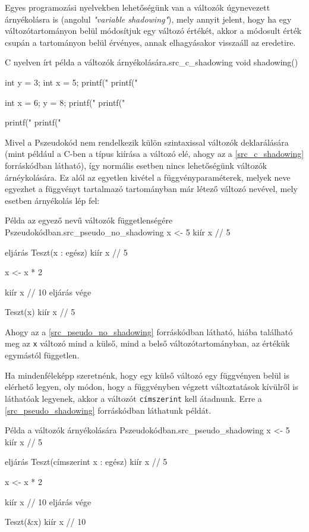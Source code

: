 Egyes programozási nyelvekben lehetőségünk van a változók úgynevezett árnyékolásra is (angolul \textit{"variable shadowing"}), mely annyit jelent, hogy ha egy változótartományon belül módosítjuk egy változó értékét, akkor a módosult érték csupán a tartományon belül érvényes, annak elhagyásakor visszaáll az eredetire.

\begin{code}{C nyelven írt példa a változók árnyékolására.}{src_c_shadowing}
void shadowing() {
    int y = 3;
    int x = 5;
    printf("%
    printf("%

    {
        int x = 6;
        y = 8;
        printf("%
        printf("%
    }

    printf("%
    printf("%
}
\end{code}

Mivel a Pszeudokód nem rendelkezik külön szintaxissal változók deklarálására (mint például a C-ben a típus kiírása a változó elé, ahogy az a \ref{src_c_shadowing} forráskódban látható), így normális esetben nincs lehetőségünk változók árnéykolására. Ez alól az egyetlen kivétel a függvényparaméterek, melyek neve egyezhet a függvényt tartalmazó tartományban már létező változó nevével, mely esetben árnyékolás lép fel:

\begin{code}{Példa az egyező nevű változók függetlenségére Pszeudokódban.}{src_pseudo_no_shadowing}
x <- 5
kiír x // 5

eljárás Teszt(x : egész)
    kiír x // 5

    x <- x * 2

    kiír x // 10
eljárás vége

Teszt(x)
kiír x // 5
\end{code}

Ahogy az a \ref{src_pseudo_no_shadowing} forráskódban látható, hiába található meg az \texttt{x} változó mind a külső, mind a belső változótartományban, az értékük egymástól független.

Ha mindenféleképp szeretnénk, hogy egy külső változó egy függvényen belül is elérhető legyen, oly módon, hogy a függvényben végzett változtatások kívülről is láthatóak legyenek, akkor a változót \texttt{címszerint} kell átadnunk. Erre a \ref{src_pseudo_shadowing} forráskódban láthatunk példát.

\begin{code}{Példa a változók árnyékolására Pszeudokódban.}{src_pseudo_shadowing}
x <- 5
kiír x // 5

eljárás Teszt(címszerint x : egész)
    kiír x // 5

    x <- x * 2

    kiír x // 10
eljárás vége

Teszt(&x)
kiír x // 10
\end{code}


